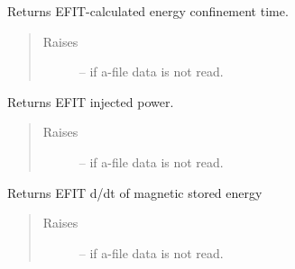 \documentclass[letterpaper,10pt,english]{sphinxmanual}
\begin{document}
\begin{fulllineitems}
\begin{fulllineitems}
\begin{quote}
\begin{description}
\end{description}\end{quote}

\end{fulllineitems}


\begin{fulllineitems}
\label{eqtools:eqtools.eqdskreader.EqdskReader.getTauMHD}
Returns EFIT-calculated energy confinement time.
\begin{quote}\begin{description}
\item[{Raises }] \leavevmode
{} -- 
if a-file data is not read.

\end{description}\end{quote}

\end{fulllineitems}


\begin{fulllineitems}
\label{eqtools:eqtools.eqdskreader.EqdskReader.getPinj}
Returns EFIT injected power.
\begin{quote}\begin{description}
\item[{Raises }] \leavevmode
{} -- 
if a-file data is not read.

\end{description}\end{quote}

\end{fulllineitems}


\begin{fulllineitems}
\label{eqtools:eqtools.eqdskreader.EqdskReader.getWbdot}
Returns EFIT d/dt of magnetic stored energy
\begin{quote}\begin{description}
\item[{Raises }] \leavevmode
{} -- 
if a-file data is not read.

\end{description}\end{quote}


\end{fulllineitems}
\end{fulllineitems}
\end{document}
